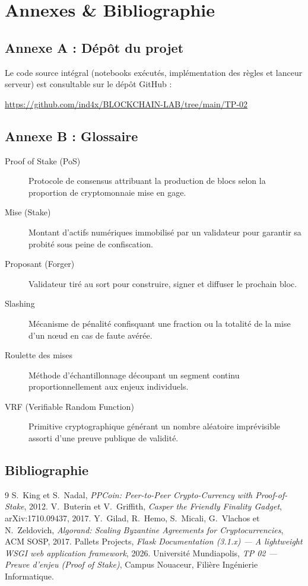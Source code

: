 \documentclass[11pt,a4paper]{article}
\begin{document}
\section{Annexes \& Bibliographie}

\subsection{Annexe A : Dépôt du projet}

Le code source intégral (notebooks exécutés, implémentation des règles et lanceur serveur) est consultable sur le dépôt GitHub :
\begin{center}
\url{https://github.com/ind4x/BLOCKCHAIN-LAB/tree/main/TP-02}
\end{center}

\subsection{Annexe B : Glossaire}
\begin{description}
    \item[Proof of Stake (PoS)] Protocole de consensus attribuant la production de blocs selon la proportion de cryptomonnaie mise en gage.
    \item[Mise (Stake)] Montant d'actifs numériques immobilisé par un validateur pour garantir sa probité sous peine de confiscation.
    \item[Proposant (Forger)] Validateur tiré au sort pour construire, signer et diffuser le prochain bloc.
    \item[Slashing] Mécanisme de pénalité confisquant une fraction ou la totalité de la mise d'un nœud en cas de faute avérée.
    \item[Roulette des mises] Méthode d'échantillonnage découpant un segment continu proportionnellement aux enjeux individuels.
    \item[VRF (Verifiable Random Function)] Primitive cryptographique générant un nombre aléatoire imprévisible assorti d'une preuve publique de validité.
\end{description}

\subsection{Bibliographie}
\begin{thebibliography}{9}
 S.~King et S.~Nadal, \emph{PPCoin: Peer-to-Peer Crypto-Currency with Proof-of-Stake}, 2012.
 V.~Buterin et V.~Griffith, \emph{Casper the Friendly Finality Gadget}, arXiv:1710.09437, 2017.
 Y.~Gilad, R.~Hemo, S.~Micali, G.~Vlachos et N.~Zeldovich, \emph{Algorand: Scaling Byzantine Agreements for Cryptocurrencies}, ACM SOSP, 2017.
 Pallets Projects, \emph{Flask Documentation (3.1.x) --- A lightweight WSGI web application framework}, 2026.
 Université Mundiapolis, \emph{TP 02 --- Preuve d'enjeu (Proof of Stake)}, Campus Nouaceur, Filière Ingénierie Informatique.
\end{thebibliography}
\end{document}
